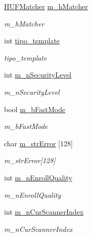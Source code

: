 \begin{DoxyCompactItemize}
\item 
\hyperlink{UFMatcher_8h_a2a955bd8ef5ebcf92278a2b037f6e739}{H\+U\+F\+Matcher} \hyperlink{classTemplateAFIS__webservice_a9e97e8c2a5aa5de8ee51fbdfe4644c39}{m\+\_\+h\+Matcher}
\begin{DoxyCompactList}\small\item\em m\+\_\+h\+Matcher \end{DoxyCompactList}\item 
int \hyperlink{classTemplateAFIS__webservice_a955d31aac4c820b4399ccbafe1b59b63}{tipo\+\_\+template}
\begin{DoxyCompactList}\small\item\em tipo\+\_\+template \end{DoxyCompactList}\item 
int \hyperlink{classTemplateAFIS__webservice_a8809dc8920da337f97252597ef492671}{m\+\_\+n\+Security\+Level}
\begin{DoxyCompactList}\small\item\em m\+\_\+n\+Security\+Level \end{DoxyCompactList}\item 
bool \hyperlink{classTemplateAFIS__webservice_a2c8421c26cc3dd7d6a3295ace4fd82ce}{m\+\_\+b\+Fast\+Mode}
\begin{DoxyCompactList}\small\item\em m\+\_\+b\+Fast\+Mode \end{DoxyCompactList}\item 
char \hyperlink{classTemplateAFIS__webservice_a83ff03441c588729601736d18eb65afd}{m\+\_\+str\+Error} \mbox{[}128\mbox{]}
\begin{DoxyCompactList}\small\item\em m\+\_\+str\+Error\mbox{[}128\mbox{]} \end{DoxyCompactList}\item 
int \hyperlink{classTemplateAFIS__webservice_ad979fde0c45dd460249d041a669a9914}{m\+\_\+n\+Enroll\+Quality}
\begin{DoxyCompactList}\small\item\em m\+\_\+n\+Enroll\+Quality \end{DoxyCompactList}\item 
int \hyperlink{classTemplateAFIS__webservice_a0d609b06768f2c253f43654966bd41e1}{m\+\_\+n\+Cur\+Scanner\+Index}
\begin{DoxyCompactList}\small\item\em m\+\_\+n\+Cur\+Scanner\+Index \end{DoxyCompactList}\item 

\end{DoxyCompactItemize}

